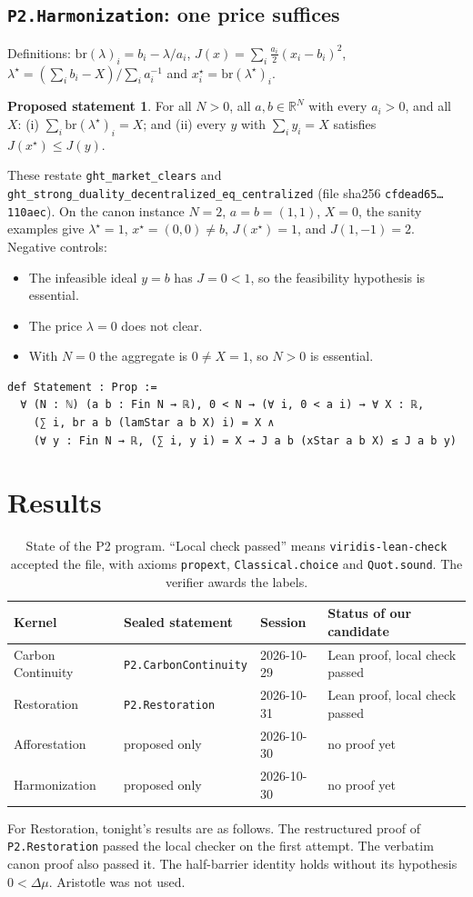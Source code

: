 \documentclass[11pt]{article}
\theoremstyle{definition}
\newtheorem{proposal}[theorem]{Proposed statement}
\theoremstyle{remark}
\begin{document}
\subsection{\texttt{P2.Harmonization}: one price suffices}
Definitions: $\mathrm{br}(\lambda)_i=b_i-\lambda/a_i$, $J(x)=\sum_i \tfrac{a_i}{2}(x_i-b_i)^2$,
$\lambda^\star=(\sum_i b_i-X)/\sum_i a_i^{-1}$ and $x^\star_i=\mathrm{br}(\lambda^\star)_i$.
\begin{proposal}
For all $N>0$, all $a,b\in\mathbb{R}^N$ with every $a_i>0$, and all $X$:
(i) $\sum_i \mathrm{br}(\lambda^\star)_i=X$; and
(ii) every $y$ with $\sum_i y_i=X$ satisfies $J(x^\star)\le J(y)$.
\end{proposal}
These restate \texttt{ght\_market\_clears} and \texttt{ght\_strong\_duality\_decentralized\_eq\_centralized}
(file sha256 \texttt{cfdead65\ldots 110aec}).
On the canon instance $N=2$, $a=b=(1,1)$, $X=0$, the sanity examples give $\lambda^\star=1$, $x^\star=(0,0)\ne b$, $J(x^\star)=1$, and $J(1,-1)=2$.
Negative controls:
\begin{itemize}
\item The infeasible ideal $y=b$ has $J=0<1$, so the feasibility hypothesis is essential.
\item The price $\lambda=0$ does not clear.
\item With $N=0$ the aggregate is $0\ne X=1$, so $N>0$ is essential.
\end{itemize}
\begin{lstlisting}
def Statement : Prop :=
  ∀ (N : ℕ) (a b : Fin N → ℝ), 0 < N → (∀ i, 0 < a i) → ∀ X : ℝ,
    (∑ i, br a b (lamStar a b X) i) = X ∧
    (∀ y : Fin N → ℝ, (∑ i, y i) = X → J a b (xStar a b X) ≤ J a b y)
\end{lstlisting}

\section{Results}
\begin{table}[h]
\centering\small
\begin{tabular}{@{}llll@{}}
\toprule
Kernel & Sealed statement & Session & Status of our candidate \\
\midrule
Carbon Continuity & \texttt{P2.CarbonContinuity} & 2026-10-29 & Lean proof, local check passed \\
Restoration & \texttt{P2.Restoration} & 2026-10-31 & Lean proof, local check passed \\
Afforestation & proposed only & 2026-10-30 & no proof yet \\
Harmonization & proposed only & 2026-10-30 & no proof yet \\
\bottomrule
\end{tabular}
\caption{State of the P2 program. ``Local check passed'' means \texttt{viridis-lean-check} accepted the file, with axioms
\texttt{propext}, \texttt{Classical.choice} and \texttt{Quot.sound}. The verifier awards the labels.}
\end{table}
For Restoration, tonight's results are as follows.
The restructured proof of \texttt{P2.Restoration} passed the local checker on the first attempt.
The verbatim canon proof also passed it.
The half-barrier identity holds without its hypothesis $0<\Delta\mu$.
Aristotle was not used.
\end{document}
